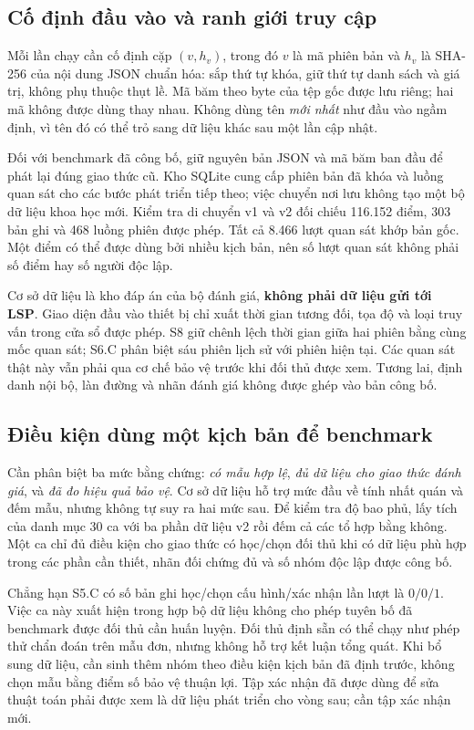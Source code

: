 \subsection{Cố định đầu vào và ranh giới truy cập}

Mỗi lần chạy cần cố định cặp $(v,h_v)$, trong đó $v$ là mã phiên bản và $h_v$ là SHA-256 của nội dung JSON chuẩn hóa: sắp thứ tự khóa, giữ thứ tự danh sách và giá trị, không phụ thuộc thụt lề. Mã băm theo byte của tệp gốc được lưu riêng; hai mã không được dùng thay nhau. Không dùng tên \emph{mới nhất} như đầu vào ngầm định, vì tên đó có thể trỏ sang dữ liệu khác sau một lần cập nhật.

Đối với benchmark đã công bố, giữ nguyên bản JSON và mã băm ban đầu để phát lại đúng giao thức cũ. Kho SQLite cung cấp phiên bản đã khóa và luồng quan sát cho các bước phát triển tiếp theo; việc chuyển nơi lưu không tạo một bộ dữ liệu khoa học mới. Kiểm tra di chuyển v1 và v2 đối chiếu 116.152 điểm, 303 bản ghi và 468 luồng phiên được phép. Tất cả 8.466 lượt quan sát khớp bản gốc. Một điểm có thể được dùng bởi nhiều kịch bản, nên số lượt quan sát không phải số điểm hay số người độc lập.

Cơ sở dữ liệu là kho đáp án của bộ đánh giá, \textbf{không phải dữ liệu gửi tới LSP}. Giao diện đầu vào thiết bị chỉ xuất thời gian tương đối, tọa độ và loại truy vấn trong cửa sổ được phép. S8 giữ chênh lệch thời gian giữa hai phiên bằng cùng mốc quan sát; S6.C phân biệt sáu phiên lịch sử với phiên hiện tại. Các quan sát thật này vẫn phải qua cơ chế bảo vệ trước khi đối thủ được xem. Tương lai, định danh nội bộ, làn đường và nhãn đánh giá không được ghép vào bản công bố.

\subsection{Điều kiện dùng một kịch bản để benchmark}

Cần phân biệt ba mức bằng chứng: \emph{có mẫu hợp lệ}, \emph{đủ dữ liệu cho giao thức đánh giá}, và \emph{đã đo hiệu quả bảo vệ}. Cơ sở dữ liệu hỗ trợ mức đầu về tính nhất quán và đếm mẫu, nhưng không tự suy ra hai mức sau. Để kiểm tra độ bao phủ, lấy tích của danh mục 30 ca với ba phần dữ liệu v2 rồi đếm cả các tổ hợp bằng không. Một ca chỉ đủ điều kiện cho giao thức có học/chọn đối thủ khi có dữ liệu phù hợp trong các phần cần thiết, nhãn đối chứng đủ và số nhóm độc lập được công bố.

Chẳng hạn S5.C có số bản ghi học/chọn cấu hình/xác nhận lần lượt là $0/0/1$. Việc ca này xuất hiện trong hợp bộ dữ liệu không cho phép tuyên bố đã benchmark được đối thủ cần huấn luyện. Đối thủ định sẵn có thể chạy như phép thử chẩn đoán trên mẫu đơn, nhưng không hỗ trợ kết luận tổng quát. Khi bổ sung dữ liệu, cần sinh thêm nhóm theo điều kiện kịch bản đã định trước, không chọn mẫu bằng điểm số bảo vệ thuận lợi. Tập xác nhận đã được dùng để sửa thuật toán phải được xem là dữ liệu phát triển cho vòng sau; cần tập xác nhận mới.


